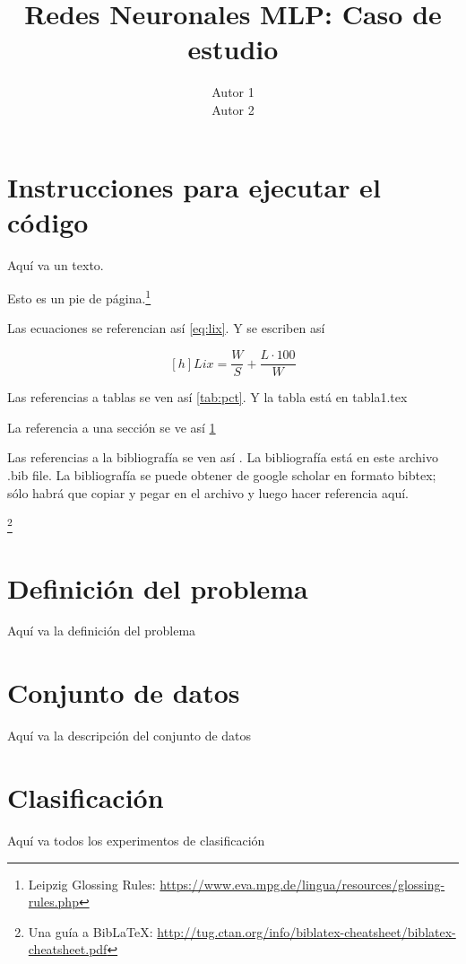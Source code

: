 \documentclass[a4paper,12pt]{article}
\title{Redes Neuronales MLP: Caso de estudio} %
\author{Autor 1 \\ Autor 2} %
\begin{document}
 \maketitle

\section{Instrucciones para ejecutar el código} %
\label{sec:intro} %
Aquí va un texto.

Esto es un pie de página.\footnote{Leipzig Glossing Rules: \url{https://www.eva.mpg.de/lingua/resources/glossing-rules.php}}

Las ecuaciones se referencian así \ref{eq:lix}. Y se escriben así 

\begin{equation} \label{eq:lix}[h]
Lix=\frac{W}{S}+\frac{L \cdot 100}{W}
\end{equation}

Las referencias a tablas se ven así \ref{tab:pct}. Y la tabla está en tabla1.tex



La referencia a una sección  se ve así \ref{sec:intro}

Las referencias a la bibliografía se ven así  \parencite{Kopka04,Mittelbach04,Van_Dongen12}. La bibliografía está en este archivo .bib file. La bibliografía se puede obtener de google scholar en formato bibtex; sólo habrá que copiar y pegar en el archivo y luego hacer referencia aquí.

\footnote{Una guía a BibLaTeX: \url{http://tug.ctan.org/info/biblatex-cheatsheet/biblatex-cheatsheet.pdf}} 

\section{Definición del problema}
\label{sec:def}
Aquí va la definición del problema

\section{Conjunto de datos}
\label{sec:datos}
Aquí va la descripción del conjunto de datos

\section{Clasificación}
\label{sec:clas}
Aquí va todos los experimentos de clasificación 
\end{document}
